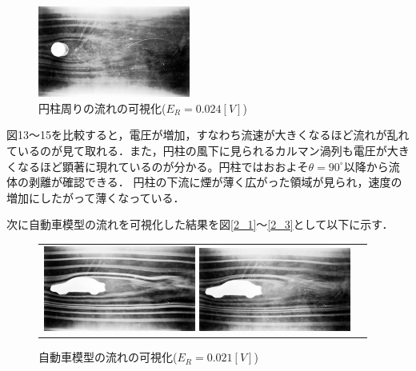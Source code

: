 \documentclass[a4paper,11pt,uplatex]{jsarticle}
\begin{document}
\begin{figure}[H]
  \begin{center}
    \includegraphics[width = 5cm]{pic/003.jpg}
    \caption{円柱周りの流れの可視化($E_R = 0.024[V]$)}
    \label{1_3}
  \end{center}
\end{figure}

図13〜15を比較すると，電圧が増加，すなわち流速が大きくなるほど流れが乱れているのが見て取れる．また，円柱の風下に見られるカルマン渦列も電圧が大きくなるほど顕著に現れているのが分かる。円柱ではおおよそ$\theta = 90^\circ$以降から流体の剥離が確認できる．
円柱の下流に煙が薄く広がった領域が見られ，速度の増加にしたがって薄くなっている．

次に自動車模型の流れを可視化した結果を図\ref{2_1}〜\ref{2_3}として以下に示す．
\begin{figure}[H]
  \begin{tabular}{cc}
    \begin{minipage}{0.5\hsize}
      \centering
      \includegraphics[width = 5cm]{pic/011.jpg}
      \caption{自動車模型の流れの可視化($E_R = 0.016[V]$)}
      \label{2_1}
    \end{minipage}

    \begin{minipage}{0.5\hsize}
      \centering
      \includegraphics[width = 5cm]{pic/012.jpg}
      \caption{自動車模型の流れの可視化($E_R = 0.021[V]$)}
      \label{2_2}
    \end{minipage}
  \end{tabular}
\end{figure}
\end{document}

